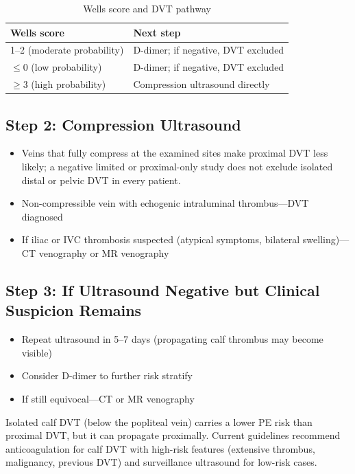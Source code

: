 \begin{table}[h]
\centering
\caption{Wells score and DVT pathway}
\begin{tabular}{|l|l|}
\hline
\textbf{Wells score} & \textbf{Next step} \\
\hline
1--2 (moderate probability) & D-dimer; if negative, DVT excluded \\
\hline
$\leq 0$ (low probability) & D-dimer; if negative, DVT excluded \\
\hline
$\geq 3$ (high probability) & Compression ultrasound directly \\
\hline
\end{tabular}
\end{table}

\subsection{Step 2: Compression Ultrasound}
\begin{itemize}
    \item Veins that fully compress at the examined sites make proximal DVT less likely; a negative limited or proximal-only study does not exclude isolated distal or pelvic DVT in every patient.
    \item Non-compressible vein with echogenic intraluminal thrombus---DVT diagnosed
    \item If iliac or IVC thrombosis suspected (atypical symptoms, bilateral swelling)---CT venography or MR venography
\end{itemize}

\subsection{Step 3: If Ultrasound Negative but Clinical Suspicion Remains}
\begin{itemize}
    \item Repeat ultrasound in 5--7 days (propagating calf thrombus may become visible)
    \item Consider D-dimer to further risk stratify
    \item If still equivocal---CT or MR venography
\end{itemize}

\begin{pearlbox}
Isolated calf DVT (below the popliteal vein) carries a lower PE risk than proximal DVT, but it can propagate proximally. Current guidelines recommend anticoagulation for calf DVT with high-risk features (extensive thrombus, malignancy, previous DVT) and surveillance ultrasound for low-risk cases.
\end{pearlbox}

